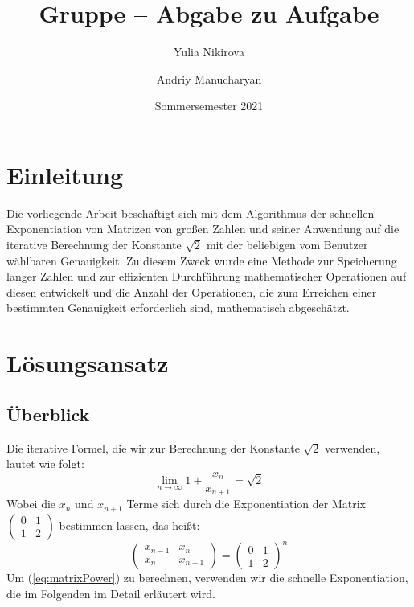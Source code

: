 \documentclass[course=erap]{aspdoc}
\author{Yulia Nikirova \and Andriy Manucharyan}
\date{Sommersemester 2021} %
\title{Gruppe \theGroup{} -- Abgabe zu Aufgabe \theNumber}
\begin{document}
\maketitle

\section{Einleitung}
Die vorliegende Arbeit beschäftigt sich mit dem Algorithmus der schnellen Exponentiation von Matrizen von großen Zahlen und seiner Anwendung auf die iterative Berechnung der Konstante  \(\sqrt{2}\) mit der beliebigen vom Benutzer wählbaren Genauigkeit. Zu diesem Zweck wurde eine Methode zur Speicherung langer Zahlen und zur effizienten Durchführung mathematischer Operationen auf diesen entwickelt und die Anzahl der Operationen, die zum Erreichen einer bestimmten Genauigkeit erforderlich sind, mathematisch abgeschätzt.
\section{Lösungsansatz}
\subsection{Überblick}%
Die iterative Formel, die wir zur Berechnung der Konstante \(\sqrt{2}\) verwenden, lautet wie folgt:
\begin{equation}\label{eq:iterativeSqrt2}
\lim_{n \to \infty} {1+\frac{x_n}{x_{n+1}}} = \sqrt{2} 
\end{equation}
Wobei die $x_n$ und $x_{n+1}$ Terme sich durch die Exponentiation der Matrix
$\begin{pmatrix}
  0 & 1\\ 
  1 & 2
\end{pmatrix}$ bestimmen lassen, das heißt:
\begin{equation}\label{eq:matrixPower}
{\begin{pmatrix}
x_{n-1} & x_n \\
x_n & x_{n+1}
\end{pmatrix} } =
{\begin{pmatrix}
0 & 1\\
1 & 2
\end{pmatrix} }^n
\end{equation}
Um (\ref{eq:matrixPower}) zu berechnen, verwenden wir die schnelle Exponentiation, die im Folgenden im Detail erläutert wird.
\end{document}
